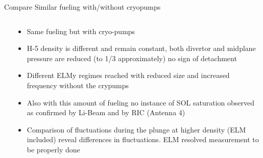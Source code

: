 \documentclass[10pt, compress]{beamer}
\newcommand\Fontvi{\fontsize{8}{7.2}\selectfont}
\begin{document}
\begin{frame}{Compare Similar fueling with/without cryopumps}
\Fontvi
  \vspace{-1cm}
\begin{columns}
  \begin{column}{0.65\textwidth}
  \end{column}
  \begin{column}{0.35\textwidth}
    \begin{itemize}
    \item<1-> Same fueling but with cryo-pumps
      \item<1-> H-5 density is different and remain constant, both
        divertor and midplane pressure are reduced (to 1/3
        approximately) no sign of detachment
      \item<2-> Different ELMy regimes reached with reduced size and
        increased frequency without the crypumps
      \item<3-> Also with this amount of fueling no instance of SOL
        saturation observed as confirmed by Li-Beam and by RIC (Antenna 4)
      \item<4> Comparison of fluctuations during the plunge at higher
        density (\alert{ELM included}) reveal differences in
        fluctuations. \alert{ELM resolved measurement to be properly done}  
        
    \end{itemize}
  \end{column}
\end{columns}
\end{frame}
\end{document}
